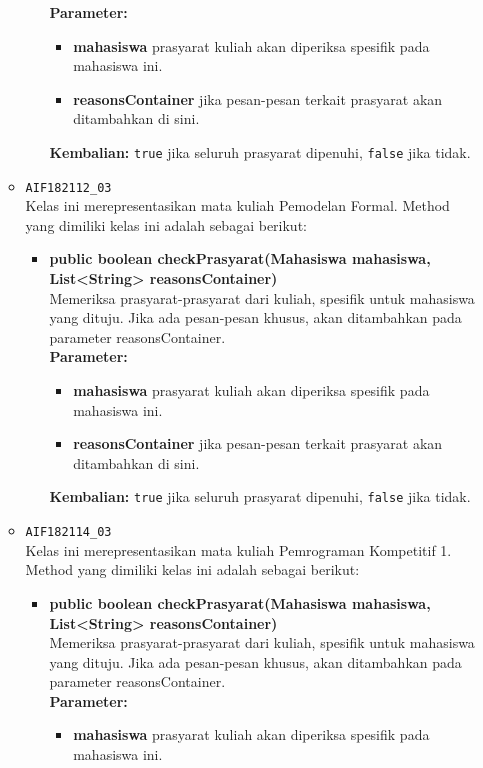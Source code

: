 \begin{enumerate}
\begin{itemize}
\begin{itemize}
			\textbf{Parameter:}
			\begin{itemize}
				\item \textbf{mahasiswa} prasyarat kuliah akan diperiksa spesifik pada mahasiswa ini.
				\item \textbf{reasonsContainer} jika pesan-pesan terkait prasyarat akan ditambahkan di sini.
			\end{itemize}
			\textbf{Kembalian:} \texttt{true} jika seluruh prasyarat dipenuhi, \texttt{false} jika tidak.
		\end{itemize}
		\item \texttt{AIF182112\_03} \\
		Kelas ini merepresentasikan mata kuliah Pemodelan Formal. Method yang dimiliki kelas ini adalah sebagai berikut: 
		\begin{itemize}
			\item \textbf{public boolean checkPrasyarat(Mahasiswa mahasiswa, List<String> reasonsContainer)}\\
			Memeriksa prasyarat-prasyarat dari kuliah, spesifik untuk mahasiswa yang dituju. Jika ada pesan-pesan khusus, akan ditambahkan pada parameter reasonsContainer.\\
			\textbf{Parameter:}
			\begin{itemize}
				\item \textbf{mahasiswa} prasyarat kuliah akan diperiksa spesifik pada mahasiswa ini.
				\item \textbf{reasonsContainer} jika pesan-pesan terkait prasyarat akan ditambahkan di sini.
			\end{itemize}
			\textbf{Kembalian:} \texttt{true} jika seluruh prasyarat dipenuhi, \texttt{false} jika tidak.
		\end{itemize}
		\item \texttt{AIF182114\_03} \\
		Kelas ini merepresentasikan mata kuliah Pemrograman Kompetitif 1. Method yang dimiliki kelas ini adalah sebagai berikut: 
		\begin{itemize}
			\item \textbf{public boolean checkPrasyarat(Mahasiswa mahasiswa, List<String> reasonsContainer)}\\
			Memeriksa prasyarat-prasyarat dari kuliah, spesifik untuk mahasiswa yang dituju. Jika ada pesan-pesan khusus, akan ditambahkan pada parameter reasonsContainer.\\
			\textbf{Parameter:}
			\begin{itemize}
				\item \textbf{mahasiswa} prasyarat kuliah akan diperiksa spesifik pada mahasiswa ini.

\end{itemize}
\end{itemize}
\end{itemize}
\end{enumerate}
